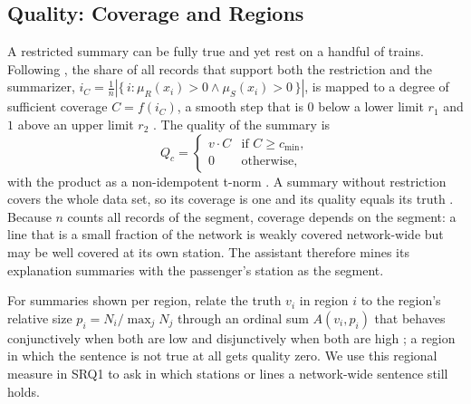 \subsection{Quality: Coverage and Regions}
\label{sec:quality}
A restricted summary can be fully true and yet rest on a handful of trains. Following
\citet{hudec2018}, the share of all records that support both the restriction and the
summarizer, $i_C = \frac{1}{n}\left|\{\, i : \mu_R(x_i) > 0 \wedge \mu_S(x_i) > 0 \,\}\right|$,
is mapped to a degree of sufficient coverage $C = f(i_C)$, a smooth step that is $0$ below a
lower limit $r_1$ and $1$ above an upper limit $r_2$ \citep[Eqs.~(A.3)--(A.4)]{hudec2018}. The
quality of the summary is
\begin{equation}
  Q_c = \begin{cases} v \cdot C & \text{if } C \ge c_{\min}, \\ 0 & \text{otherwise},
  \end{cases}
\end{equation}
with the product as a non-idempotent t-norm \citep[Eq.~(9)]{hudec2018}. A summary without
restriction covers the whole data set, so its coverage is one and its quality equals its
truth \citep[p.~987]{hudec2018}. Because $n$ counts all records of the segment, coverage
depends on the segment: a line that is a small fraction of the network is weakly covered
network-wide but may be well covered at its own station. The assistant therefore mines its
explanation summaries with the passenger's station as the segment.

For summaries shown per region, \citet{hudec2022} relate the truth $v_i$ in region $i$ to the
region's relative size $p_i = N_i / \max_j N_j$ through an ordinal sum $A(v_i, p_i)$ that
behaves conjunctively when both are low and disjunctively when both are high
\citep[Eqs.~(8), (13)--(16)]{hudec2022}; a region in which the sentence is not true at all
gets quality zero. We use this regional measure in SRQ1 to ask in which stations or lines a
network-wide sentence still holds.

